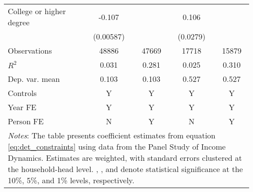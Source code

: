 {\begin{tabular}{l*{4}{c}}
\addlinespace
College or higher degree&      -0.107\sym{***}&                     &       0.106\sym{***}&                     \\
                    &   (0.00587)         &                     &    (0.0279)         &                     \\
\midrule
Observations        &       48886         &       47669         &       17718         &       15879         \\
\(R^{2}\)           &       0.031         &       0.281         &       0.025         &       0.310         \\
Dep. var. mean      &       0.103         &       0.103         &       0.527         &       0.527         \\
Controls            &           Y         &           Y         &           Y         &           Y         \\
Year FE             &           Y         &           Y         &           Y         &           Y         \\
Person FE           &           N         &           Y         &           N         &           Y         \\
\bottomrule
\multicolumn{5}{p{17cm}}{\footnotesize \textit{Notes}: The table presents coefficient estimates from equation \ref{eq:det_constraints} using data from the Panel Study of Income Dynamics. Estimates are weighted, with standard errors clustered at the household-head level. \sym{*}, \sym{**}, and \sym{***} denote statistical significance at the 10\%, 5\%, and 1\% levels, respectively.}\\
\end{tabular}
}
